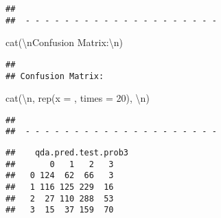 \documentclass[
]{article}
\newenvironment{Shaded}{\begin{snugshade}}{\end{snugshade}}
\newcommand{\AttributeTok}[1]{\textcolor[rgb]{0.77,0.63,0.00}{#1}}
\newcommand{\DecValTok}[1]{\textcolor[rgb]{0.00,0.00,0.81}{#1}}
\newcommand{\FunctionTok}[1]{\textcolor[rgb]{0.00,0.00,0.00}{#1}}
\newcommand{\NormalTok}[1]{#1}
\newcommand{\OtherTok}[1]{\textcolor[rgb]{0.56,0.35,0.01}{#1}}
\newcommand{\SpecialCharTok}[1]{\textcolor[rgb]{0.00,0.00,0.00}{#1}}
\newcommand{\StringTok}[1]{\textcolor[rgb]{0.31,0.60,0.02}{#1}}
\begin{document}
\begin{verbatim}
## 
##  - - - - - - - - - - - - - - - - - - - -
\end{verbatim}

\begin{Shaded}
\begin{Highlighting}[]
\FunctionTok{cat}\NormalTok{(}\StringTok{\textquotesingle{}}\SpecialCharTok{\textbackslash{}n}\StringTok{Confusion Matrix:}\SpecialCharTok{\textbackslash{}n}\StringTok{\textquotesingle{}}\NormalTok{)}
\end{Highlighting}
\end{Shaded}

\begin{verbatim}
## 
## Confusion Matrix:
\end{verbatim}

\begin{Shaded}
\begin{Highlighting}[]
\FunctionTok{cat}\NormalTok{(}\StringTok{\textquotesingle{}}\SpecialCharTok{\textbackslash{}n}\StringTok{\textquotesingle{}}\NormalTok{, }\FunctionTok{rep}\NormalTok{(}\AttributeTok{x =} \StringTok{\textquotesingle{}{-}\textquotesingle{}}\NormalTok{, }\AttributeTok{times =} \DecValTok{20}\NormalTok{), }\StringTok{\textquotesingle{}}\SpecialCharTok{\textbackslash{}n}\StringTok{\textquotesingle{}}\NormalTok{)}
\end{Highlighting}
\end{Shaded}

\begin{verbatim}
## 
##  - - - - - - - - - - - - - - - - - - - -
\end{verbatim}

\begin{Shaded}
\end{Shaded}

\begin{verbatim}
##    qda.pred.test.prob3
##       0   1   2   3
##   0 124  62  66   3
##   1 116 125 229  16
##   2  27 110 288  53
##   3  15  37 159  70
\end{verbatim}

\begin{Shaded}
\end{Shaded}
\end{document}
